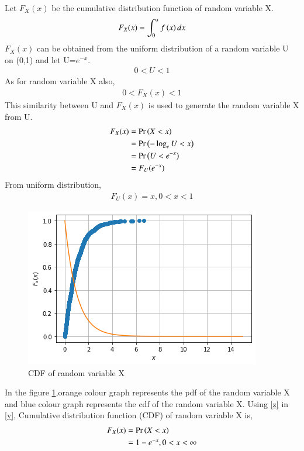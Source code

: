 \documentclass[journal,12pt,twocolumn]{IEEEtran}
\begin{document}
Let $F_X(x)$ be the cumulative distribution function of random variable X.
\begin{align}
    F_X(x)=\int_{0}^x f\left(x\right) dx\label{x}
\end{align}
$F_X(x)$ can be obtained from the uniform distribution of a random variable U on (0,1) and let U=$e^{-x}$. 
\begin{align}
    0 < U < 1
\end{align}
As for random variable X also,
\begin{align}
    0 < F_X(x) < 1
\end{align}
This similarity between U and $F_X(x)$ is used to generate the random variable X from U.
\begin{align}
    F_X(x)&=\Pr\left(X<x\right)\\
    &=\Pr\left(-\log_e U<x\right)\\
    &=\Pr\left(U<e^{-x}\right)\\
    &=F_U(e^{-x})\label{y}
\end{align}
From uniform distribution,
\begin{align}
    F_U(x)= x ,0<x<1 \label{z}
\end{align}
\begin{figure}[ht]
    \centering
    \includegraphics[width=\columnwidth]{Fig_1_assign_4.png}
    \caption{CDF  of random variable X}
\label{fig_1}
\end{figure}
In the figure \ref{fig_1},orange colour graph represents the pdf of the random variable X and blue colour graph represents the cdf of the random variable X.
Using \eqref{z} in \eqref{y},
Cumulative distribution function (CDF) of random variable X is,
\begin{align}
F_X(x) &= \Pr\left(X<x\right)\\
&= 1 -e^{-x} ,0<x<\infty \label{g}
\end{align}
\end{document}
